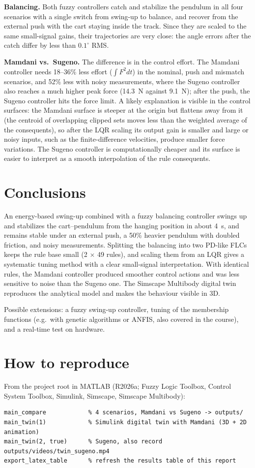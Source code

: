 \documentclass[11pt,a4paper]{article}
\begin{document}
\textbf{Balancing.} Both fuzzy controllers catch and stabilize the pendulum in all four scenarios with a single switch from swing-up to balance, and recover from the external push with the cart staying inside the track. Since they are scaled to the same small-signal gains, their trajectories are very close: the angle errors after the catch differ by less than $0.1^\circ$ RMS.

\textbf{Mamdani vs.\ Sugeno.} The difference is in the control effort. The Mamdani controller needs 18--36\% less effort ($\int F^2 dt$) in the nominal, push and mismatch scenarios, and 52\% less with noisy measurements, where the Sugeno controller also reaches a much higher peak force (14.3~N against 9.1~N); after the push, the Sugeno controller hits the force limit. A likely explanation is visible in the control surfaces: the Mamdani surface is steeper at the origin but flattens away from it (the centroid of overlapping clipped sets moves less than the weighted average of the consequents), so after the LQR scaling its output gain is smaller and large or noisy inputs, such as the finite-difference velocities, produce smaller force variations. The Sugeno controller is computationally cheaper and its surface is easier to interpret as a smooth interpolation of the rule consequents.

\section{Conclusions}
An energy-based swing-up combined with a fuzzy balancing controller swings up and stabilizes the cart--pendulum from the hanging position in about 4~s, and remains stable under an external push, a 50\% heavier pendulum with doubled friction, and noisy measurements. Splitting the balancing into two PD-like FLCs keeps the rule base small (2 $\times$ 49 rules), and scaling them from an LQR gives a systematic tuning method with a clear small-signal interpretation. With identical rules, the Mamdani controller produced smoother control actions and was less sensitive to noise than the Sugeno one. The Simscape Multibody digital twin reproduces the analytical model and makes the behaviour visible in 3D.

Possible extensions: a fuzzy swing-up controller, tuning of the membership functions (e.g.\ with genetic algorithms or ANFIS, also covered in the course), and a real-time test on hardware.

\appendix
\section{How to reproduce}
From the project root in MATLAB (R2026a; Fuzzy Logic Toolbox, Control System Toolbox, Simulink, Simscape, Simscape Multibody):
\begin{lstlisting}
main_compare            % 4 scenarios, Mamdani vs Sugeno -> outputs/
main_twin(1)            % Simulink digital twin with Mamdani (3D + 2D animation)
main_twin(2, true)      % Sugeno, also record outputs/videos/twin_sugeno.mp4
export_latex_table      % refresh the results table of this report
\end{lstlisting}
\end{document}
